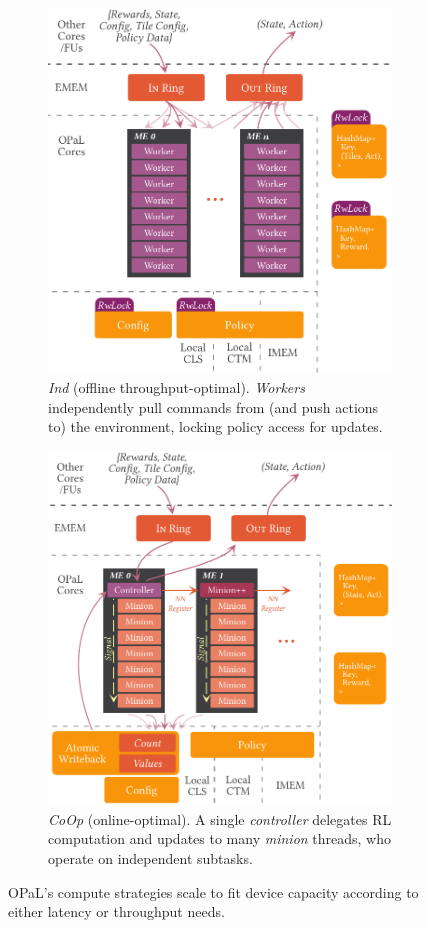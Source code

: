 \documentclass[
sigconf,natbib=false
,anonymous=true
,10pt
]{acmart}
\newcommand{\approachshort}{OPaL}
\newcommand{\Coopfw}{\emph{CoOp}}
\newcommand{\Indfw}{\emph{Ind}}
\begin{document}
\begin{figure}
	\centering
	\begin{subfigure}{0.47\linewidth}
		\centering
		\includegraphics[keepaspectratio, width=0.78\linewidth]{figures/ind}
		\caption{\Indfw{} (offline throughput-optimal). \emph{Workers} independently pull commands from (and push actions to) the environment, locking policy access for updates.\label{fig:single-and-parallel:single}}
	\end{subfigure}
	\hspace{0.04\linewidth}
	\begin{subfigure}{0.47\linewidth}
		\centering
		\includegraphics[keepaspectratio, width=0.8\linewidth]{figures/coop}
		\caption{\Coopfw{} (online-optimal). A single \emph{controller} delegates RL computation and updates to many \emph{minion} threads, who operate on independent subtasks.\label{fig:single-and-parallel:parallel}}
	\end{subfigure}
	\caption{\approachshort{}'s compute strategies scale to fit device capacity according to either latency or throughput needs.\label{fig:single-and-parallel}}
\end{figure}
\end{document}

